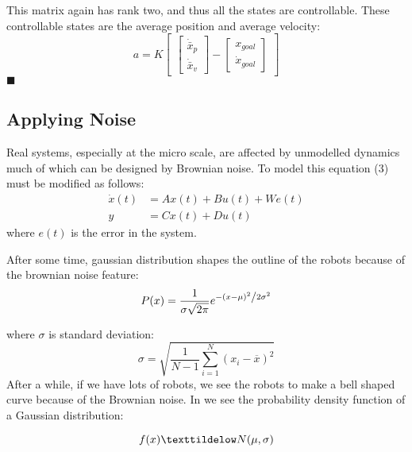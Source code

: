 \documentclass[10pt,letterpaper]{article}
\begin{document}
\begin{flushleft}
This matrix again  has rank two, and thus all the states are controllable. These controllable states are the average position and average velocity:
\begin{equation}
a = K\begin{bmatrix}
\begin{bmatrix}
\dot{\bar{x}}_p \\
\dot{\bar{x}}_v
\end{bmatrix}
-
\begin{bmatrix}
x_{goal} \\
\dot{x}_{goal}
\end{bmatrix}
\end{bmatrix}
\end{equation}
$\blacksquare$ \\

\subsection{Applying Noise}

Real systems, especially at the micro scale, are affected by unmodelled dynamics much of which can be designed by Brownian noise. To model this equation (3) must be modified as follows:
\begin{align}
\dot{x}(t)  &=  A x(t) + B u(t) + We(t)\\
y &= C x(t) + D u(t)\nonumber
\end{align}
where $e(t)$ is the error in the system.

After some time, gaussian distribution shapes the outline of the robots because of the brownian noise feature:\\
\begin{equation}
P(x) = \frac{1}{{\sigma \sqrt {2\pi } }}e^{{{ - \left( {x - \mu } \right)^2 } \mathord{\left/ {\vphantom {{ - \left( {x - \mu } \right)^2 } {2\sigma ^2 }}} \right. \kern-\nulldelimiterspace} {2\sigma ^2 }}}
\end{equation}

where $\sigma$ is standard deviation:
\begin{equation}
\sigma = \sqrt{\frac{1}{N-1} \sum_{i=1}^N (x_i - \overline{x})^2}
\end{equation}
After a while, if we have lots of robots, we see the robots to make a bell shaped curve because of the Brownian noise. In we see the probability density function of a Gaussian distribution:\\
\end{flushleft}
\begin{equation}
f(x) \texttildelow N(\mu , \sigma)
\end{equation}
\end{document}
